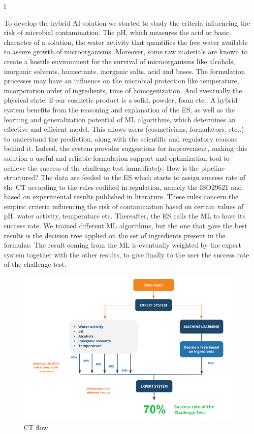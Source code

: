 l\documentclass[a4paper,12pt,twoside]{report}
\begin{document}
To develop the hybrid AI solution we started to study the criteria influencing the risk of microbial contamination. The pH, which measures the acid or basic character of a solution, the water activity that quantifies the free water available to assure growth of microorganisms. Moreover, some raw materials are known to create a hostile environment for the survival of microorganisms like alcohols, inorganic solvents, humectants, inorganic salts, acid and bases. The formulation processes may have an influence on the microbial protection like temperature, incorporation order of ingredients, time of homogenization. And eventually the physical state, if our cosmetic product is a solid, powder, foam etc..
A hybrid system benefits from the reasoning and explanation of the ES, as well as the learning and generalization potential of ML algorithms, which determines an effective and efficient model. 
This allows users (cosmeticians, formulators, etc..) to understand the prediction, along with the scientific and regulatory reasons behind it. Indeed, the system provides suggestions for improvement, making this solution a useful and reliable formulation support and optimization tool to achieve the success of the challenge test immediately. 
How is the pipeline structured? The data are feeded to the ES which starts to assign success rate of the CT according to the rules codified in regulation, namely the ISO29621 and based on experimental results published in literature. These rules concern the empiric criteria influencing the risk of contamination based on certain values of pH, water activity, temperature etc. 
Thereafter, the ES calls the ML to have its success rate. We trained different ML algorithms, but the one that gave the best results is the decision tree applied on the set of ingredients present in the formulas. The result coming from the ML is eventually weighted by the expert system together with the other results, to give finally to the user the success rate of the challenge test.

\begin{figure}
		\includegraphics[width=\textwidth]{images/ctFlow}
	\caption[WorkFlow of CT prediction in CF]{CT flow}
\end{figure}
\end{document}
